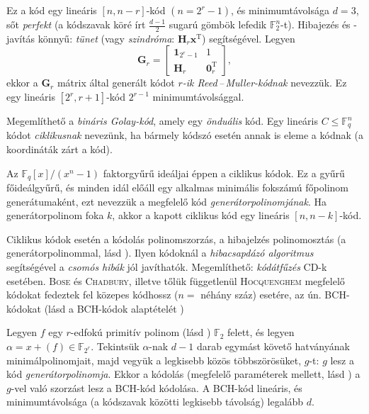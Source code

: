\documentclass[DIV=15,appendixprefix]{scrreprt}
\theoremstyle{definition}
\theoremstyle{remark}
\DeclareMathOperator{\T}{T}
\begin{document}
Ez a kód egy lineáris $ \left[ n,{} n - r  \right] $-kód $ \left( n = 2^{ r } - 1 \right) $, és
minimumtávolsága $ d = 3 $, sőt \emph{perfekt} (a
kódszavak köré írt $ \frac{ d - 1 }{ 2 } $ sugarú gömbök lefedik $ \mathbb{ F }_{ 2 }^{ n } $-t).
Hibajezés és -javítás könnyű: \emph{tünet} (vagy \emph{szindróma}: $ \mathbf{ H }_{ r }
\mathbf{ x }^{ \T } $)
segítségével.
%
Legyen
\begin{equation*}
	\mathbf{ G }_{ r } = \begin{bmatrix}
		\mathbf{ 1 }_{ 2^{ r } - 1 }	&	1\\
		\mathbf{ H }_{ r }				&	\mathbf{ 0 }_{ r }^{ \T }
	\end{bmatrix},
\end{equation*}
ekkor a $ \mathbf{ G }_{ r } $ mátrix által generált kódot \emph{$ r $-ik Reed\,--\,Muller-kódnak}
nevezzük. Ez egy lineáris $ \left[ 2^{ r },{} r + 1 \right] $-kód $ 2^{ r  - 1 } $
minimumtávolsággal.

Megemlíthető a \emph{bináris Golay-kód}, amely egy \emph{önduális} kód.
%
Egy lineáris $ C \le \mathbb{ F }_{ q }^{ n } $ kódot \emph{ciklikusnak} nevezünk, ha bármely
kódszó esetén annak  is eleme a kódnak (a koordináták
 zárt a kód).

Az $ \mathbb{ F }_{ q } \left[ x \right] / \left( x^{ n } - 1 \right) $ faktorgyűrű ideáljai éppen a
ciklikus kódok. Ez a gyűrű főideálgyűrű, és minden idál előáll egy alkalmas minimális fokszámú
főpolinom generátumaként, ezt nevezzük a megfelelő kód \emph{generátorpolinomjának}. Ha
generátorpolinom foka $ k $, akkor a kapott ciklikus kód egy lineáris $ \left[ n,{} n - k
\right] $-kód.

Ciklikus kódok esetén a kódolás polinomszorzás, a hibajelzés polinomosztás (a generátorpolinommal,
lásd \cite[39.~oldal]{Czedli}). Ilyen kódoknál a \emph{hibacsapdázó algoritmus} segítségével a
\emph{csomós hibák} jól javíthatók. Megemlíthető: \emph{kódátfűzés} CD-k esetében.
%
\textsc{Bose} és \textsc{Chadbury}, illetve tőlük függetlenül \textsc{Hocquenghem} megfelelő
kódokat fedeztek fel közepes kódhossz ($ n = $ néhány száz) esetére, az ún. BCH-kódokat (lásd a
BCH-kódok alaptételét \cite[3.6.~tétel, 36.~oldal]{Czedli})

Legyen $ f $ egy $ r $-edfokú primitív polinom (lásd \cite[35.~oldal]{Czedli})
$ \mathbb{ F }_{ 2 } $ felett, és legyen $ \alpha =
x + \left( f \right) \in \mathbb{ F }_{ 2^{ r } } $. Tekintsük $ \alpha $-nak $ d - 1 $ darab
egymást követő hatványának minimálpolinomjait, majd vegyük a legkisebb közös többszörösüket,
$ g $-t: $ g $ lesz a kód \emph{generátorpolinomja}. Ekkor a kódolás (megfelelő paraméterek mellett,
lásd \cite[3.7.~definíció, 38.~oldal]{Czedli}) a $ g $-vel való szorzást lesz a BCH-kód kódolása. A
BCH-kód lineáris, és minimumtávolsága (a kódszavak közötti legkisebb távolság) legalább $ d $.
\end{document}
